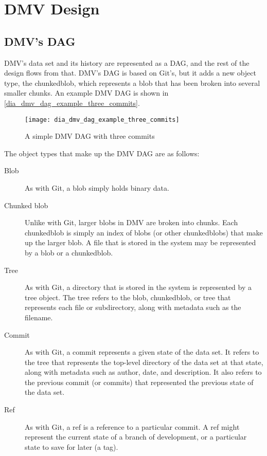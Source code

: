 \chapter{DMV Design}


\section{DMV's DAG}

DMV's data set and its history are represented as a DAG, and the rest of the
design flows from that. DMV's DAG is based on Git's, but it adds a new object
type, the \gls{chunkedblob}, which represents a \gls{blob} that has been broken
into several smaller chunks. An example DMV DAG is shown in
\autoref{dia_dmv_dag_example_three_commits}.

\begin{figure}[]
    \centering
    \texttt{[image: dia\_dmv\_dag\_example\_three\_commits]}
    \caption{A simple DMV DAG with three commits}
    \label{dia_dmv_dag_example_three_commits}
\end{figure}

The object types that make up the DMV DAG are as follows:

\begin{description}

    \item[Blob] As with Git, a \gls{blob} simply holds binary data.

    \item[Chunked blob] Unlike with Git, larger \glspl{blob} in DMV are
        broken into chunks. Each \gls{chunkedblob} is simply an index of
        \glspl{blob} (or other \glspl{chunkedblob}) that make up the larger
        \gls{blob}. A file that is stored in the system may be represented by a
        \gls{blob} or a \gls{chunkedblob}.

    \item[Tree] As with Git, a directory that is stored in the system is
        represented by a \gls{tree} object. The \gls{tree} refers to the
        \gls{blob}, \gls{chunkedblob}, or \gls{tree} that represents each file
        or subdirectory, along with metadata such as the filename.

    \item[Commit] As with Git, a commit represents a given state of the data
        set. It refers to the \gls{tree} that represents the top-level directory
        of the data set at that state, along with metadata such as author, date,
        and description. It also refers to the previous commit (or commits) that
        represented the previous state of the data set.

    \item[Ref] As with Git, a ref is a reference to a particular commit. A ref
        might represent the current state of a branch of development, or a
        particular state to save for later (a tag).

\end{description}


